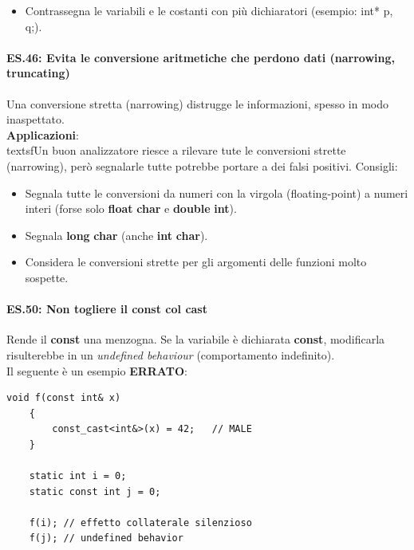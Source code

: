 \begin{itemize}
	\item \textsf{\small Contrassegna le variabili e le costanti con più dichiaratori (esempio: int* p, q;).}
\end{itemize}

\paragraph{ES.46: Evita le conversione aritmetiche che perdono dati (narrowing, truncating)}

\textsf{\small Una conversione stretta (narrowing) distrugge le informazioni, spesso in modo inaspettato.} \\

\textsf{\small \textbf{Applicazioni}: } \\

textsf{\small Un buon analizzatore riesce a rilevare tute le conversioni strette (narrowing), però segnalarle tutte potrebbe portare a dei falsi positivi. Consigli: }

\begin{itemize}
	\item \textsf{\small  Segnala tutte le conversioni da numeri con la virgola (floating-point) a numeri interi (forse solo \textbf{float} \textrightarrow \textbf{char} e \textbf{double} \textrightarrow \textbf{int}).}
	\item \textsf{\small Segnala \textbf{long} \textrightarrow \textbf{char} (anche \textbf{int} \textrightarrow \textbf{char}).}
	\item \textsf{\small Considera le conversioni strette per gli argomenti delle funzioni molto sospette.}
\end{itemize}

\paragraph{ES.50: Non togliere il const col cast}

\textsf{\small Rende il \textbf{const} una menzogna. Se la variabile è dichiarata \textbf{const}, modificarla risulterebbe in un \emph{undefined behaviour} (comportamento indefinito).} \\

\textsf{\small Il seguente è un esempio \textbf{\color{red}ERRATO}\normalcolor:}

\begin{lstlisting}[frame=single, rulecolor=\color{red}]
	void f(const int& x)
	{
		const_cast<int&>(x) = 42;   // MALE
	}
	
	static int i = 0;
	static const int j = 0;
	
	f(i); // effetto collaterale silenzioso
	f(j); // undefined behavior
\end{lstlisting}

